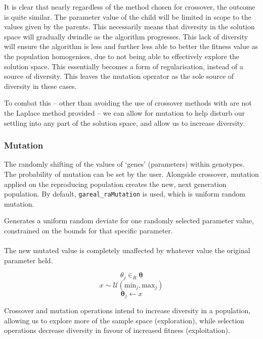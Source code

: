 \documentclass[
  a4paper,
]{article}
\newcommand{\B}[1]{\boldsymbol{#1}}
\newcommand{\+}{\phantom{-}}
\begin{document}
It is clear that nearly regardless of the method chosen for crossover,
the outcome is quite similar. The parameter value of the child will be
limited in scope to the values given by the parents. This necessarily
means that diversity in the solution space will gradually dwindle as the
algorithm progresses. This lack of diversity will ensure the algorithm
is less and further less able to better the fitness value as the
population homogenises, due to not being able to effectively explore the
solution space. This essentially becomes a form of regularisation,
instead of a source of diversity. This leaves the mutation operator as
the sole source of diversity in these cases.

To combat this -- other than avoiding the use of crossover methods with
are not the Laplace method provided -- we can allow for mutation to help
disturb our settling into any part of the solution space, and allow us
to increase diversity.

\subsubsection{\texorpdfstring{\textbf{Mutation}}{Mutation}}\label{mutation}

The randomly shifting of the values of `genes' (parameters) within
genotypes. The probability of mutation can be set by the user. Alongside
crossover, mutation applied on the reproducing population creates the
new, next generation population. By default, \texttt{gareal\_raMutation}
is used, which is uniform random mutation.

\begin{tcolorbox}[title=Uniform random mutation: \texttt{gareal\_raMutation()}]
Generates a uniform random deviate for one randomly selected parameter value, constrained on the bounds for that specific parameter.\\
\\
The new mutated value is completely unaffected by whatever value the original parameter held.

$$\theta_j \in_R \B \theta$$
$$x\sim \mathcal U \! \left( \text{min}_j, \text{max}_j \right)$$
$$\B \theta _j \leftarrow x$$
\end{tcolorbox}

Crossover and mutation operations intend to increase diversity in a
population, allowing us to explore more of the sample space
(exploration), while selection operations decrease diversity in favour
of increased fitness (exploitation).
\end{document}
